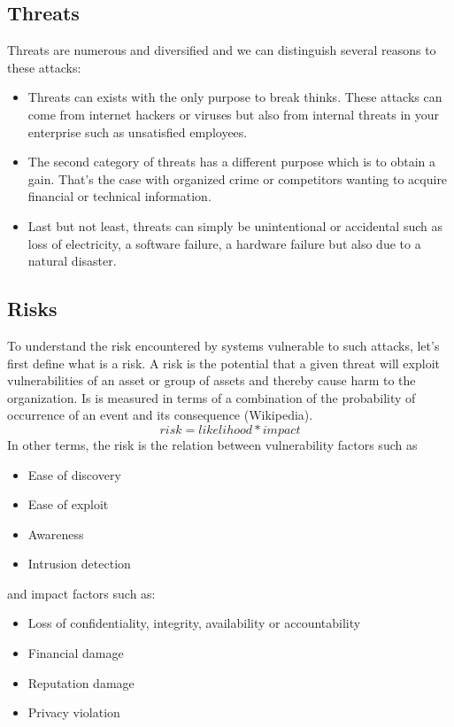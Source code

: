 \subsection{Threats}
Threats are numerous and diversified and we
can distinguish several reasons to these attacks: \begin{itemize}{} \item
Threats can exists with the only purpose to break thinks. These attacks can come
from internet hackers or viruses but also from internal threats in your
enterprise such as unsatisfied employees. \item The second category of threats
has a different purpose which is to obtain a gain. That's the case with
organized crime or competitors wanting to acquire financial or technical
information. \item Last but not least, threats can simply be unintentional or
accidental such as loss of electricity, a software failure, a hardware failure
but also due to a natural disaster. \end{itemize}

\subsection{Risks}
To understand the risk encountered by systems vulnerable to such attacks, let's
first define what is a risk. A risk is the potential that a given threat will
exploit vulnerabilities of an asset or group of assets and thereby cause harm to
the organization. Is is measured in terms of a combination of the probability of
occurrence of an event and its consequence (Wikipedia).
\[
   risk = likelihood * impact
\]
In other terms, the risk is the relation between vulnerability factors such as 
\begin{itemize}{}
\item Ease of discovery
\item Ease of exploit
\item Awareness
\item Intrusion detection
\end{itemize}
and impact factors such as:
\begin{itemize}{}
\item Loss of confidentiality, integrity, availability or accountability
\item Financial damage
\item Reputation damage
\item Privacy violation
\end{itemize}

